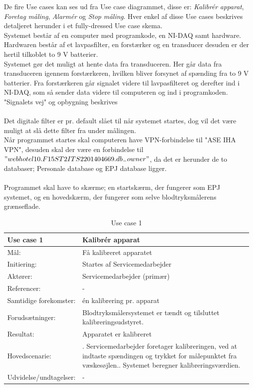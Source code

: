 De fire Use cases kan ses ud fra Use case diagrammet, disse er: \textit{Kalibrér apparat}, \textit{Foretag måling}, \textit{Alarmér} og \textit{Stop måling}. Hver enkel af disse Use cases beskrives detaljeret herunder i et fully-dressed Use case skema.\\
Systemet består af en computer med programkode, en NI-DAQ samt hardware. Hardwaren består af et lavpasfilter, en forstærker og en transducer desuden er der hertil tilkoblet to 9 V batterier.
\\
Systemet gør det muligt at hente data fra transduceren. Her går data fra transduceren igennem forstærkeren, hvilken bliver forsynet af spænding fra to 9 V batterier. Fra forstærkeren går signalet videre til lavpasfilteret og derefter ind i NI-DAQ, som så sender data videre til computeren og ind i programkoden. 
\\ 

"Signalets vej" og opbygning beskrives\\\\

Det digitale filter er pr. default slået til når systemet startes, dog vil det være muligt at slå dette filter fra under målingen.\\
Når programmet startes skal computeren have VPN-forbindelse til "ASE IHA VPN", desuden skal der være en forbindelse til $"webhotel10.F15ST2ITS2201404669.db_{-}owner"$, da det er herunder de to databaser; Personale database og EPJ database ligger.\\\\
Programmet skal have to skærme; en startskærm, der fungerer som EPJ systemet, og en hovedskærm, der fungerer som selve blodtryksmålerens grænseflade.

\begin{table}[H]
\caption{Use case 1}\label{tab:tabel4}
\begin{tabular}{| l | >{\raggedright\arraybackslash}p{11cm} |}
   \hline
   \textbf{Use case 1} & \textbf{Kalibrér apparat}\\ \hline
   Mål: & Få kalibreret apparatet \\ \hline
   Initiering: & Startes af Servicemedarbejder\\ \hline
   Aktører:& Servicemedarbejder (primær)\\ \hline
   Referencer: & - \\ \hline
   Samtidige forekomster: & én kalibrering pr. apparat \\\hline
   Forudsætninger: & Blodtryksmålersystemet er tændt og tilsluttet kalibreringsudstyret.\\ \hline
   Resultat:& Apparatet er kalibreret\\ \hline
   Hovedscenarie:& 
1. Servicemedarbejder foretager kalibreringen, ved at indtaste spændingen og trykket for målepunktet fra væskesøjlen.\newline
2. Systemet beregner kalibreringsværdien.\\\hline
Udvidelse/undtagelser: & - \\\hline
\end{tabular}
\end{table}


